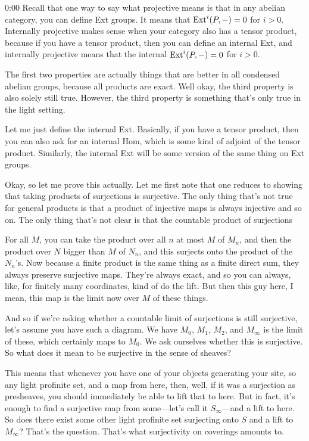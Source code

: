 \begin{unfinished}{0:00}
Recall that one way to say what projective means is that in any abelian category, you can define Ext groups. It means that $\operatorname{Ext}^i(P,-)=0$ for $i>0$. Internally projective makes sense when your category also has a tensor product, because if you have a tensor product, then you can define an internal Ext, and internally projective means that the internal $\operatorname{Ext}^i(P,-)=0$ for $i>0$.

The first two properties are actually things that are better in all condensed abelian groups, because all products are exact. Well okay, the third property is also solely still true. However, the third property is something that's only true in the light setting.

Let me just define the internal Ext. Basically, if you have a tensor product, then you can also ask for an internal Hom, which is some kind of adjoint of the tensor product. Similarly, the internal Ext will be some version of the same thing on Ext groups.

Okay, so let me prove this actually. Let me first note that one reduces to showing that taking products of surjections is surjective. The only thing that's not true for general products is that a product of injective maps is always injective and so on. The only thing that's not clear is that the countable product of surjections

For all $M$, you can take the product over all $n$ at most $M$ of $M_n$, and then the product over $N$ bigger than $M$ of $N_n$, and this surjects onto the product of the $N_n$'s. Now because a finite product is the same thing as a finite direct sum, they always preserve surjective maps. They're always exact, and so you can always, like, for finitely many coordinates, kind of do the lift. But then this guy here, I mean, this map is the limit now over $M$ of these things.

And so if we're asking whether a countable limit of surjections is still surjective, let's assume you have such a diagram. We have $M_0$, $M_1$, $M_2$, and $M_\infty$ is the limit of these, which certainly maps to $M_0$. We ask ourselves whether this is surjective. So what does it mean to be surjective in the sense of sheaves?

This means that whenever you have one of your objects generating your site, so any light profinite set, and a map from here, then, well, if it was a surjection as presheaves, you should immediately be able to lift that to here. But in fact, it's enough to find a surjective map from some---let's call it $S_\infty$---and a lift to here. So does there exist some other light profinite set surjecting onto $S$ and a lift to $M_\infty$? That's the question. That's what surjectivity on coverings amounts to.


\end{unfinished}
